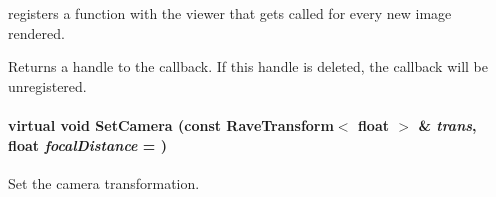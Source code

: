 registers a function with the viewer that gets called for every new image rendered. 

\begin{DoxyReturn}{Returns}
a handle to the callback. If this handle is deleted, the callback will be unregistered. 
\end{DoxyReturn}
\hypertarget{classOpenRAVE_1_1ViewerBase_ae426230d17214ba9e81e7ca30a1437e6}{
\paragraph[{SetCamera}]{\setlength{\rightskip}{0pt plus 5cm}virtual void SetCamera (const RaveTransform$<$ float $>$ \& {\em trans}, \/  float {\em focalDistance} = {})}\hfill}
\label{classOpenRAVE_1_1ViewerBase_ae426230d17214ba9e81e7ca30a1437e6}


Set the camera transformation. 


